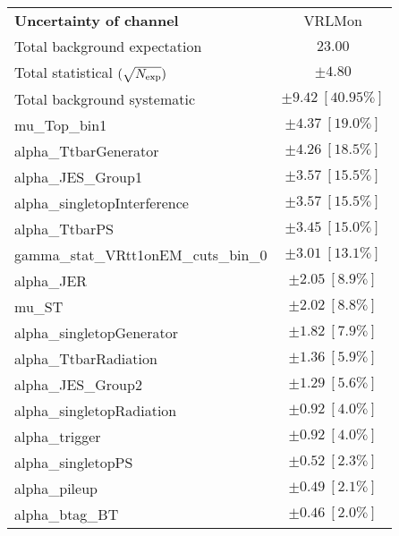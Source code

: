 
\begin{table}
\begin{center}
\setlength{\tabcolsep}{0.0pc}
\begin{tabular*}{\textwidth}{@{\extracolsep{\fill}}lc}
\noalign{\smallskip}\hline\noalign{\smallskip}
{\bf Uncertainty of channel}                                    & VRLMon           \\
\noalign{\smallskip}\hline\noalign{\smallskip}
Total background expectation             &  $23.00$       \\
\noalign{\smallskip}\hline\noalign{\smallskip}
Total statistical $(\sqrt{N_{\rm exp}})$              & $\pm 4.80$       \\
Total background systematic               & $\pm 9.42\ [40.95\%] $             \\
\noalign{\smallskip}\hline\noalign{\smallskip}
\noalign{\smallskip}\hline\noalign{\smallskip}
mu\_Top\_bin1         & $\pm 4.37\ [19.0\%] $       \\
alpha\_TtbarGenerator         & $\pm 4.26\ [18.5\%] $       \\
alpha\_JES\_Group1         & $\pm 3.57\ [15.5\%] $       \\
alpha\_singletopInterference         & $\pm 3.57\ [15.5\%] $       \\
alpha\_TtbarPS         & $\pm 3.45\ [15.0\%] $       \\
gamma\_stat\_VRtt1onEM\_cuts\_bin\_0         & $\pm 3.01\ [13.1\%] $       \\
alpha\_JER         & $\pm 2.05\ [8.9\%] $       \\
mu\_ST         & $\pm 2.02\ [8.8\%] $       \\
alpha\_singletopGenerator         & $\pm 1.82\ [7.9\%] $       \\
alpha\_TtbarRadiation         & $\pm 1.36\ [5.9\%] $       \\
alpha\_JES\_Group2         & $\pm 1.29\ [5.6\%] $       \\
alpha\_singletopRadiation         & $\pm 0.92\ [4.0\%] $       \\
alpha\_trigger         & $\pm 0.92\ [4.0\%] $       \\
alpha\_singletopPS         & $\pm 0.52\ [2.3\%] $       \\
alpha\_pileup         & $\pm 0.49\ [2.1\%] $       \\
alpha\_btag\_BT         & $\pm 0.46\ [2.0\%] $       \\

\end{tabular*}
\end{center}
\end{table}
